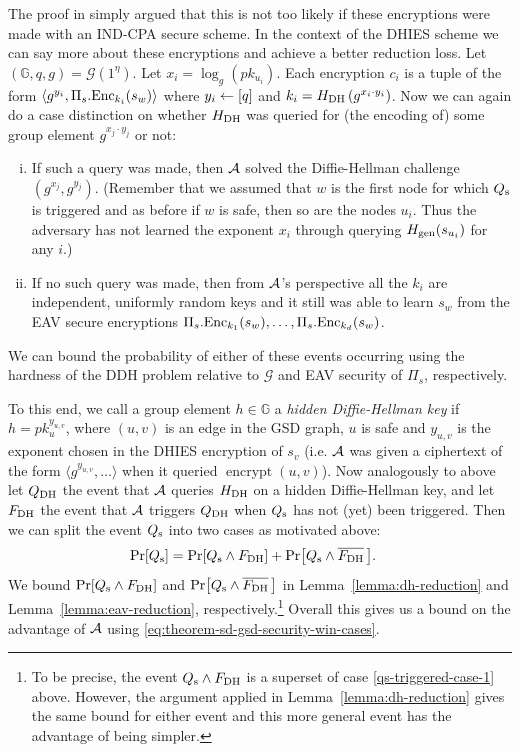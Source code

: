The proof in \cite{ttkem} simply argued that this is not too likely if these encryptions were made with an IND-CPA secure scheme. In the context of the DHIES scheme we can say more about these encryptions and achieve a better reduction loss.
Let $(\mathbb{G}, q, g) = \mathcal{G}(1^\eta)$.
Let $x_i = \log_g(pk_{u_i})$. Each encryption $c_i$ is a tuple of the form $\langle g^{y_i}, \Pi_s.\mathrm{Enc}_{k_i}(s_w) \rangle$ where $y_i \leftarrow [q]$ and $k_i = H_\mathrm{DH}\left(g^{x_i \cdot y_i}\right)$. Now we can again do a case distinction on whether $H_\mathrm{DH}$ was queried for (the encoding of) some group element $g^{x_j \cdot y_j}$ or not:
\begin{enumerate}[(i)]
	\item \label{qs-triggered-case-1} If such a query was made, then $\mathcal{A}$ solved the Diffie-Hellman challenge $(g^{x_j}, g^{y_j})$. (Remember that we assumed that $w$ is the first node for which $Q_\mathrm{s}$ is triggered and as before if $w$ is safe, then so are the nodes $u_i$. Thus the adversary has not learned the exponent $x_i$ through querying $H_\mathrm{gen}(s_{u_i})$ for any $i$.)
	\item \label{qs-triggered-case-2} If no such query was made, then from $\mathcal{A}$'s perspective all the $k_i$ are independent, uniformly random keys and it still was able to learn $s_w$ from the EAV secure encryptions $\Pi_s.\mathrm{Enc}_{k_1}(s_w), \ldots, \Pi_s.\mathrm{Enc}_{k_d}(s_w)$.
\end{enumerate}
We can bound the probability of either of these events occurring using the hardness of the DDH problem relative to $\mathcal{G}$ and EAV security of $\Pi_s$, respectively.

To this end, we call a group element $h \in \mathbb{G}$ a \emph{hidden Diffie-Hellman key} if $h = pk_u^{y_{u, v}}$, where $(u, v)$ is an edge in the GSD graph, $u$ is safe and $y_{u, v}$ is the exponent chosen in the DHIES encryption of $s_v$ (i.e. $\mathcal{A}$ was given a ciphertext of the form $\langle g^{y_{u, v}}, \ldots\rangle$ when it queried $\operatorname{encrypt}(u, v)$). Now analogously to above let $Q_\mathrm{DH}$ the event that $\mathcal{A}$ queries $H_\mathrm{DH}$ on a hidden Diffie-Hellman key, and let $F_\mathrm{DH}$ the event that $\mathcal{A}$ triggers $Q_\mathrm{DH}$ when $Q_\mathrm{s}$ has not (yet) been triggered.
Then we can split the event $Q_\mathrm{s}$ into two cases as motivated above:
\begin{align*}
	\pr{\qs} & = \pr{\qs \land \fdh} + \pr{\qs \land \overline{\fdh} \,}.
\end{align*}
We bound $\pr{\qs \land \fdh}$ and $\pr{\qs \land \overline{\fdh} \,}$ in Lemma~\ref{lemma:dh-reduction} and Lemma~\ref{lemma:eav-reduction}, respectively.\footnote{To be precise, the event $Q_\mathrm{s} \land F_\mathrm{DH}$ is a superset of case \ref{qs-triggered-case-1} above. However, the argument applied in Lemma~\ref{lemma:dh-reduction} gives the same bound for either event and this more general event has the advantage of being simpler.}
Overall this gives us a bound on the advantage of $\mathcal{A}$ using \eqref{eq:theorem-sd-gsd-security-win-cases}.

